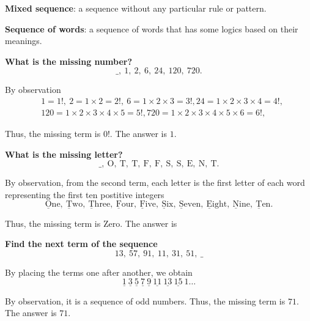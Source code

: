 \documentclass{article}
\begin{document}
\textbf{Mixed sequence}: a sequence without any particular rule or pattern.

\textbf{Sequence of words}: a sequence of words that has some logics based on their meanings.

\newpage

\begin{problem*} \textbf{What is the missing number?}
    \[
        \_,\ 1,\ 2,\ 6,\ 24,\ 120,\ 720.
    \]
\end{problem*}

\begin{soln}
    By observation
    \[
        \begin{aligned}
            &1 = 1!,\ 2 = 1 \times 2 = 2!,\ 6 = 1 \times 2 \times 3 = 3!, 24 = 1 \times 2 \times 3 \times 4 = 4!,\\
            &120 = 1 \times 2 \times 3 \times 4 \times 5 = 5!, 720 = 1 \times 2 \times 3 \times 4 \times 5 \times 6 = 6!, 
        \end{aligned}
    \]
    
    Thus, the missing term is $0!.$ The answer is $\boxed{1.}$
\end{soln}

\begin{problem*} \textbf{What is the missing letter?}
    \[
        \_,\ \text{O},\ \text{T},\ \text{T},\ \text{F},\ \text{F},\ \text{S},\ \text{S},\ \text{E},\ \text{N},\ \text{T}.
    \]
\end{problem*}

\begin{soln}
    By observation, from the second term, each letter is the first letter of each word representing the first ten postitive integers
    \[
        \underline{\text{O}}\text{ne},\ \underline{\text{T}}\text{wo},\ \underline{\text{T}}\text{hree},\ \underline{\text{F}}\text{our},\
        \underline{\text{F}}\text{ive},\ \underline{\text{S}}\text{ix},\ \underline{\text{S}}\text{even},\ \underline{\text{E}}\text{ight},\
        \underline{\text{N}}\text{ine},\ \underline{\text{T}}\text{en.}
    \]
    
    Thus, the missing term is Zero. The answer is 
\end{soln}

\begin{problem*} \textbf{Find the next term of the sequence}
    \[
        13,\ 57,\ 91,\ 11,\ 31,\ 51,\ \_
    \]
\end{problem*}

\begin{soln}
    By placing the terms one after another, we obtain
    \[
        \underline{1}\ \underline{3}\ \underline{5}\ \underline{7}\ \underline{9}\ \underline{11}\ \underline{13}\ \underline{15}\ 1\ldots
    \]
    
    By observation, it is a sequence of odd numbers.
    Thus, the missing term is $71$. The answer is $\boxed{71.}$
\end{soln}
\end{document}
